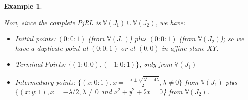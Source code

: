 \documentclass{article}
\newtheorem{example}{Example}[section]
\begin{document}
\begin{example}
\begin{description}
\begin{itemize}
\end{itemize}

\end{description}

Now, since the complete PjRL is $\mathbb V(J_1) \cup \mathbb V(J_2)$, we have:
\begin{itemize}
\item Initial points: $(0:0:1)$ (from $\mathbb V(J_1)$) plus $(0:0:1)$ (from $\mathbb V(J_2)$); so we have a duplicate 
point at 
$(0:0:1)$ or at $(0,0)$ in affine plane $XY$.
\item Terminal Points: $\{(1:0:0), (-1:0:1)\}$, only from $\mathbb V(J_1)$
\item Intermediary points: $\{(x:0:1), x=\frac{-\lambda\pm\sqrt{\lambda^2-4\lambda}}{2}, \lambda\neq 0\}$ from 
$\mathbb V(J_1)$ plus 
$\{(x:y:1), x=-\lambda/2, \lambda\neq 0$ and $x^2+y^2+2x=0$\} from $\mathbb V(J_2)$.


\end{itemize}

\end{example}
\end{document}
